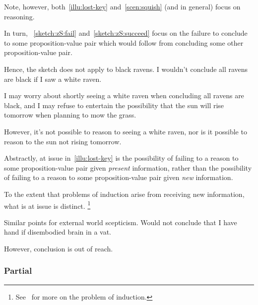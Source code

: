 \begin{note}
  Note, however, both~\autoref{illu:lost-key} and~\autoref{scen:squish} (and  in general) focus on reasoning.

  In turn, ~\ref{sketch:zS:fail} and~\ref{sketch:zS:succeed} focus on the failure to conclude to some proposition-value pair which would follow from concluding some other proposition-value pair.

  Hence, the sketch does not apply to black ravens.
  I wouldn't conclude all ravens are black if I saw a white raven.

  I may worry about shortly seeing a white raven when concluding all ravens are black, and I may refuse to entertain the possibility that the sun will rise tomorrow when planning to mow the grass.

  However, it's not possible to reason to seeing a white raven, nor is it possible to reason to the sun not rising tomorrow.

  Abstractly, at issue in~\autoref{illu:lost-key} is the possibility of failing to a reason to some proposition-value pair given \emph{present} information, rather than the possibility of failing to a reason to some proposition-value pair given \emph{new} information.

  To the extent that problems of induction arise from receiving new information, what is at issue is distinct.%
  \footnote{
    See~\textcite{Henderson:2020wb} for more on the problem of induction.
  }

  Similar points for external world scepticism.
  Would not conclude that I have hand if disembodied brain in a vat.

  However, conclusion is out of reach.
\end{note}

\subsubsection{Partial}

